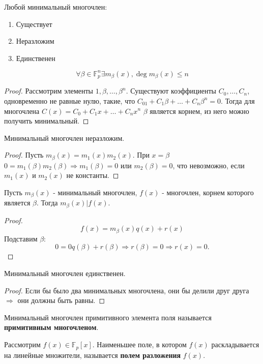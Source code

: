 \documentclass[11pt]{article}
\newcounter{th}\setcounter{th}{0}
\def\th{\par\smallskip\refstepcounter{th}\textbf{\arabic{th}}}
\newtheorem*{Theorem}{Теорема \th}
\newcounter{cnsqnc}\setcounter{cnsqnc}{0}
\def\cnsqnc{\par\smallskip\refstepcounter{cnsqnc}\textbf{\arabic{cnsqnc}}}
\newtheorem*{Consequence}{Следствие \cnsqnc}
\begin{document}
Любой минимальный многочлен:
\begin{enumerate}
\item Существует
\item Неразложим
\item Единственен
\end{enumerate}
\begin{Theorem}
$$\forall \beta \in \mathbb{F}_p^n \exists m_{\beta}(x), \deg m_{\beta}(x) \leq n$$
\begin{proof}
Рассмотрим элементы $1, \beta, \ldots, \beta^n$. Существуют коэффициенты $C_0, \ldots, C_n$,
одновременно не равные нулю, такие, что $C_01 + C_1\beta + \ldots + C_n\beta^n = 0$.
Тогда для многочлена $C(x) = C_0 + C_1x + \ldots + C_nx^n$ $\beta$ является корнем, из него
можно получить минимальный.
\end{proof}
\end{Theorem}
\begin{Theorem}
Минимальный многочлен неразложим.
\begin{proof}
Пусть $m_{\beta}(x) = m_1(x)m_2(x)$. При $x = \beta$ $0 = m_1(\beta)m_2(\beta) \Rightarrow m_1(\beta) = 0$
или $m_2(\beta) = 0$, что невозможно, если $m_1(x)$ и $m_2(x)$ не константы.
\end{proof}
\end{Theorem}
\begin{Theorem}
Пусть $m_{\beta}(x)$ - минимальный многочлен, $f(x)$ - многочлен, корнем которого является $\beta$.
Тогда $m_{\beta}(x) | f(x)$.
\begin{proof}
\begin{equation}
f(x) = m_{\beta}(x)q(x) + r(x)
\end{equation}
Подставим $\beta$:
\begin{equation}
0 = 0q(\beta) + r(\beta) \Rightarrow r(\beta) = 0 \Rightarrow r(x) = 0.
\end{equation}
\end{proof}
\end{Theorem}
\begin{Consequence}
Минимальный многочлен единственен.
\begin{proof}
Если бы было два минимальных многочлена, они бы делили друг друга $\Rightarrow$ они должны быть равны.
\end{proof}
\end{Consequence}
Минимальный многочлен примитивного элемента поля называется \textbf{примитивным многочленом}.

Рассмотрим $f(x) \in \mathbb{F}_p[x]$. Наименьшее поле, в котором $f(x)$ раскладывается на
линейные множители, называется \textbf{полем разложения} $f(x)$.
\end{document}
